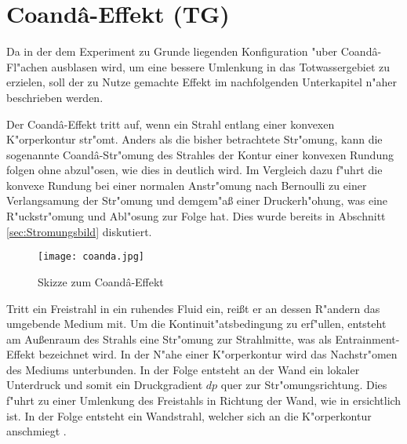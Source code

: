 \section{Coand\^{a}-Effekt (TG)}

Da in der dem Experiment zu Grunde liegenden Konfiguration "uber Coand\^{a}-Fl"achen ausblasen wird, um eine bessere Umlenkung in das Totwassergebiet zu erzielen, soll der zu Nutze gemachte Effekt im  nachfolgenden Unterkapitel n"aher beschrieben werden.

Der Coand\^{a}-Effekt tritt auf, wenn ein Strahl entlang einer konvexen K"orperkontur str"omt. Anders als die bisher betrachtete Str"omung, kann die sogenannte Coand\^{a}-Str"omung des Strahles der Kontur einer konvexen Rundung folgen ohne abzul"osen, wie dies in  deutlich wird. Im Vergleich dazu f"uhrt die konvexe Rundung bei einer normalen Anstr"omung nach Bernoulli zu einer Verlangsamung der Str"omung und demgem"a\ss{} einer Druckerh"ohung, was eine R"uckstr"omung und Abl"osung zur Folge hat. Dies wurde bereits in Abschnitt \ref{sec:Stromungsbild} diskutiert.

\begin{figure}[h]
	\centering
	\texttt{[image: coanda.jpg]}
	\caption{Skizze zum Coand\^{a}-Effekt \cite{Stadlberger.2016}}
	\label{fig:coanda}
\end{figure}

Tritt ein Freistrahl in ein ruhendes Fluid ein, rei\ss{}t er an dessen R"andern das umgebende Medium mit. Um die Kontinuit"atsbedingung zu erf"ullen, entsteht am Au\ss{}enraum des Strahls eine Str"omung zur Strahlmitte, was als Entrainment-Effekt bezeichnet wird. In der N"ahe einer K"orperkontur wird das Nachstr"omen des Mediums unterbunden. In der Folge entsteht an der Wand ein lokaler Unterdruck und somit ein Druckgradient $dp$ quer zur Str"omungsrichtung. Dies f"uhrt zu einer Umlenkung des Freistahls in Richtung der Wand, wie in  ersichtlich ist. In der Folge entsteht ein Wandstrahl, welcher sich an die K"orperkontur anschmiegt \cite{Fernholz.1966}. 

